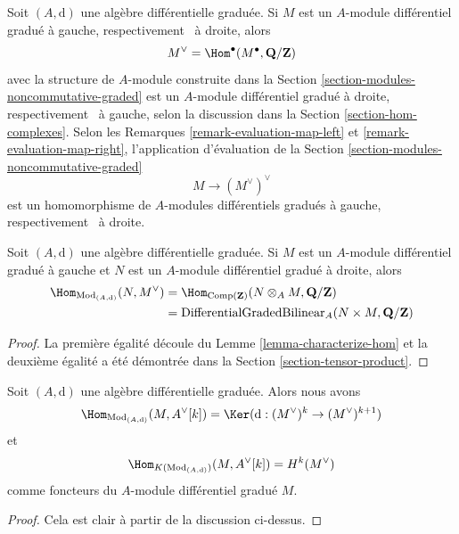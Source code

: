 \noindent
Soit $(A, \text{d})$ une algèbre différentielle graduée. Si $M$ est un $A$-module
différentiel gradué à gauche, respectivement \ à droite, alors
$$
M^\vee = \Hom^\bullet(M^\bullet, \mathbf{Q}/\mathbf{Z})
$$
avec la structure de $A$-module construite dans la Section
\ref{section-modules-noncommutative-graded} est un $A$-module différentiel gradué
à droite, respectivement \ à gauche, selon la discussion dans la Section
\ref{section-hom-complexes}. Selon les Remarques \ref{remark-evaluation-map-left}
et \ref{remark-evaluation-map-right}, l'application d'évaluation de la Section
\ref{section-modules-noncommutative-graded}
$$
M \longrightarrow (M^\vee)^\vee
$$
est un homomorphisme de $A$-modules différentiels gradués à gauche, respectivement
\ à droite.

\begin{lemma}
\label{lemma-map-into-dual}
Soit $(A, \text{d})$ une algèbre différentielle graduée. Si $M$ est un $A$-module
différentiel gradué à gauche et $N$ est un $A$-module différentiel gradué à
droite, alors
\begin{align*}
\Hom_{\text{Mod}_{(A, \text{d})}}(N, M^\vee)
& =
\Hom_{\text{Comp}(\mathbf{Z})}(N \otimes_A M, \mathbf{Q}/\mathbf{Z}) \\
& =
\text{DifferentialGradedBilinear}_A(N \times M, \mathbf{Q}/\mathbf{Z})
\end{align*}
\end{lemma}

\begin{proof}
La première égalité découle du Lemme \ref{lemma-characterize-hom} et la deuxième
égalité a été démontrée dans la Section \ref{section-tensor-product}.
\end{proof}

\begin{lemma}
\label{lemma-hom-into-shift-dual-free}
Soit $(A, \text{d})$ une algèbre différentielle graduée. Alors nous avons
$$
\Hom_{\text{Mod}_{(A, \text{d})}}(M, A^\vee[k]) =
\Ker(\text{d} : (M^\vee)^k \to (M^\vee)^{k + 1})
$$
et
$$
\Hom_{K(\text{Mod}_{(A, \text{d})})}(M, A^\vee[k]) = H^k(M^\vee)
$$
comme foncteurs du $A$-module différentiel gradué $M$.
\end{lemma}

\begin{proof}
Cela est clair à partir de la discussion ci-dessus.
\end{proof}















